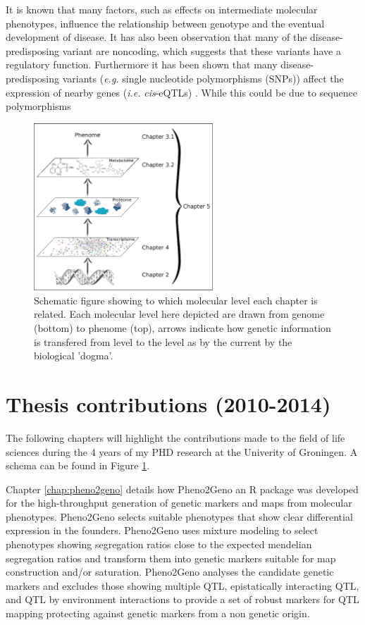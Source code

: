 It is known that many factors, such as effects on intermediate molecular phenotypes, influence 
the relationship between genotype and the eventual development of disease. It has also been 
observation that many of the disease-predisposing variant are noncoding, which suggests that 
these variants have a regulatory function. Furthermore it has been shown that many disease-predisposing variants 
(\emph{e.g.} single nucleotide polymorphisms (SNPs)) affect the expression of nearby genes (\emph{i.e.} 
\emph{cis}-eQTLs) \cite{Powell:2012, Lude:2011, Zeller:2010}. While this could be due to sequence 
polymorphisms 

\begin{figure}[h!]
 \centering
    \includegraphics[width=0.6\textwidth]{eps/image_1_3}
  \caption[ThesisLayout.]
    {Schematic figure showing to which molecular level each chapter is related. Each molecular 
    level here depicted are drawn from genome (bottom) to phenome (top), arrows indicate 
    how genetic information is transfered from level to the level as by the current by 
    the biological 'dogma'.}
    \label{fig:layout}
\end{figure}

\section{Thesis contributions (2010-2014)}
The following chapters will highlight the contributions made to the field of life 
sciences during the 4 years of my PHD research at the Univerity of Groningen. A schema can be found in Figure \ref{fig:layout}.

Chapter \ref{chap:pheno2geno} details how Pheno2Geno an R package was developed for 
the high-throughput generation of genetic markers and maps from molecular phenotypes. 
Pheno2Geno selects suitable phenotypes that show clear differential expression in the founders. Pheno2Geno 
uses mixture modeling to select phenotypes showing segregation ratios close to the 
expected mendelian segregation ratios and transform them into genetic markers suitable 
for map construction and/or saturation. Pheno2Geno analyses the candidate genetic 
markers and excludes those showing multiple QTL, epistatically interacting QTL, and QTL 
by environment interactions to provide a set of robust markers for QTL mapping protecting 
against genetic markers from a non genetic origin.

